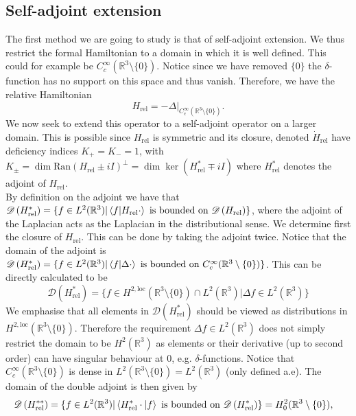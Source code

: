 \documentclass[a4paper,11pt]{article}
\newcommand{\dom}[1]{\mathscr D\left(#1\right)}
\newcommand{\R}{\mathbb{R}}
\numberwithin{equation}{section}
\begin{document}
\subsection{Self-adjoint extension}
The first method we are going to study is that of self-adjoint extension. We thus restrict the formal Hamiltonian to a domain in which it is well defined. This could for example be $ C_c^\infty(\mathbb{R}^3\setminus\{0\}) $. Notice since we have removed $ \{0\} $ the $ \delta $-function has no support on this space and thus vanish. Therefore, we have the relative Hamiltonian \begin{equation}
H_{\text{rel}}=-\Delta\rvert_{C_c^\infty(\mathbb{R}^3\setminus\{0\})}.
\end{equation}
We now seek to extend this operator to a self-adjoint operator on a larger domain. This is possible since $ H_{\text{rel}} $ is symmetric and its closure, denoted $ \dot{H}_{\text{rel}} $ have deficiency indices $ K_+=K_-=1 $, with $ K_\pm=\dim\text{Ran}(H_{\text{rel}}\pm iI)^\perp=\dim\ker(H_{\text{rel}}^*\mp iI) $ where $ H_{\text{rel}}^* $ denotes the adjoint of $ H_{\text{rel}} $. \\
By definition on the adjoint we have that $ \dom{H_{\text{rel}}^*}=\{f\in L^2(\R^3)\rvert \braket{f|H_{\text{rel}}\cdot} \text{ is bounded on }\dom{H_{\text{rel}}}\} $, where the adjoint of the Laplacian acts as the Laplacian in the distributional sense. We determine first the closure of $ H_{\text{rel}} $. This can be done by taking the adjoint twice. Notice that the domain of the adjoint is $ \dom{H_{\text{rel}}^*}=\{f\in L^2(\R^3)\rvert \braket{f|\Delta\cdot} \text{ is bounded on }C_c^\infty(\R^3\setminus\{0\})\} $. This can be directly calculated to be \begin{equation}
\dom{H_{\text{rel}}^*}=\{f\in H^{2,\text{loc}}(\R^3\setminus\{0\})\cap L^2(\R^3)\rvert \Delta f \in L^2(\R^3)\}
\end{equation}
We emphasise that all elements in $ \dom{H_{\text{rel}}^*} $ should be viewed as distributions in $ H^{2,\text{loc}}(\R^3\setminus\{0\}) $. Therefore the requirement $ \Delta f\in L^2(\R^3) $ does not simply restrict the domain to be $ H^2(\R^3) $ as elements or their derivative (up to second order) can have singular behaviour at $ 0 $, e.g. $ \delta $-functions.
 Notice that $ C_c^\infty(\mathbb{R}^3\setminus\{0\}) $ is dense in $ L^2(\mathbb{R}^3\setminus\{0\})=L^2(\R^3) $ (only defined a.e).  The domain of the double adjoint is then given by \begin{equation}\begin{aligned}
\dom{H_{\text{rel}}^{**}}&=\{f\in L^2(\R^3)\rvert \braket{H_{\text{rel}}^*\cdot|f} \text{ is bounded on }\dom{H_{\text{rel}}^*}\}=H^2_0(\R^3\setminus\{0\}),
\end{aligned}
\end{equation} 
\end{document}
